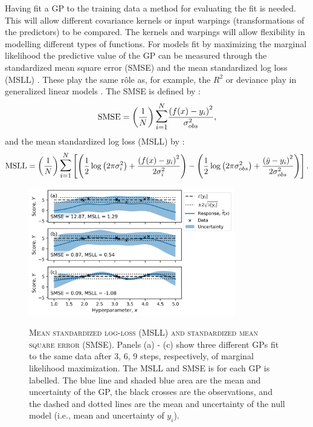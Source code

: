Having fit a GP to the training data a method for evaluating the fit is needed. This will allow different covariance kernels or input warpings (transformations of the predictors) to be compared. The kernels and warpings will allow flexibility in modelling different types of functions. For models fit by maximizing the marginal likelihood the predictive value of the GP can be measured through the standardized mean square error (SMSE) and the mean standardized log loss (MSLL) \cite{rasmussenGaussianProcessesMachine2006}. These play the same r\^ole as, for example, the $R^2$ or deviance play in generalized linear models \cite{dobson2018introduction}. The SMSE is defined by \cite{rasmussenGaussianProcessesMachine2006}:
\begin{equation}\label{eqn:smse}
\mathrm{SMSE} =\left(\frac{1}{N}\right) \mathlarger{\mathlarger{\sum}}_{i=1}^{N} \frac{\left(f(x)-y_{i}\right)^{2}}{\sigma_{obs}^{2}},
\end{equation}
and the mean standardized log loss (MSLL) by \cite{rasmussenGaussianProcessesMachine2006}:
\begin{equation}\label{eqn:msll}
\mathrm{MSLL}=\left(\frac{1}{N}\right) \mathlarger{\mathlarger{\sum}}_{i=1}^{N}\left[\left(\frac{1}{2} \log \left(2 \pi \sigma_{i}^{2}\right)+\frac{\left(f(x)-y_{i}\right)^{2}}{2\sigma_{i}^{2}}\right)-\left(\frac{1}{2} \log \left(2 \pi \sigma_{obs}^{2}\right)+\frac{\left(\bar{y}-y_{i}\right)^{2}}{2\sigma_{obs}^{2}}\right)\right].
\end{equation}  

\begin{figure}
    \centering
    \caption[Mean standardized log-loss (MSLL) and standardized mean square error (SMSE)]{\textsc{Mean standardized log-loss (MSLL) and standardized mean square error (SMSE)}. Panels (a) - (c) show three different GPs fit to the same data after 3, 6, 9 steps, respectively, of marginal likelihood maximization. The MSLL and SMSE is for each GP is labelled. The blue line and shaded blue area are the mean and uncertainty of the GP, the black crosses are the observations, and the dashed and dotted lines are the mean and uncertainty of the null model (i.e., mean and uncertainty of $y_{i}$).}
    \includegraphics[width=0.8\textwidth]{chapters/msm_optimization/figures/gp_metric_explainer.png}
    \label{fig:msm_gp_metric_explainer}
\end{figure}

